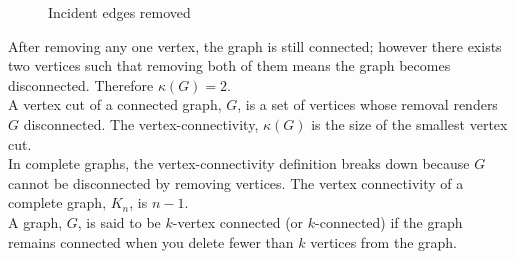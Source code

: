 \begin{minipage}{0.3\textwidth}
    \begin{figure}[H]
        \centering
        \caption{Incident edges removed}
    \end{figure}
\end{minipage} \vspace{0.5em}

After removing any one vertex, the graph is still connected; however there exists two vertices such that removing both of them means the graph becomes disconnected. Therefore $\kappa(G) = 2$. \\

A vertex cut of a connected graph, $G$, is a set of vertices whose removal renders $G$ disconnected. The vertex-connectivity, $\kappa(G)$ is the size of the smallest vertex cut.\\

In complete graphs, the vertex-connectivity definition breaks down because $G$ cannot be disconnected by removing vertices. The vertex connectivity of a complete graph, $K_n$, is $n-1$.\\

A graph, $G$, is said to be $k$-vertex connected (or $k$-connected) if the graph remains connected when you delete fewer than $k$ vertices from the graph.